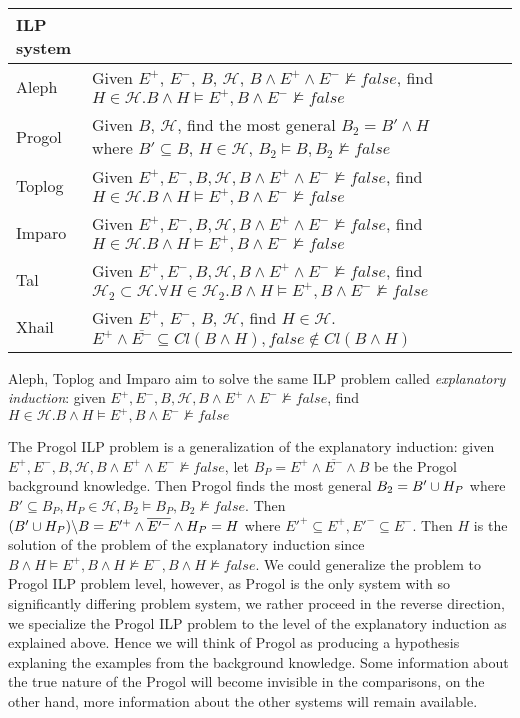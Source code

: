 \begin{center}
    \begin{tabular}{ | l | p{15cm} | l | p{5cm} |}
    \hline
    ILP system & \\ \hline
    Aleph & Given $E^{+}$, $E^{-}$, $B$, $\mathcal{H}$, $B \land E^{+} \land E^{-} \not\models false$, find $H \in \mathcal{H}. B \land H \models E^{+}, B \land E^{-} \not\models false$\\ \hline
    Progol & Given $B$, $\mathcal{H}$, find the most general $B_2 = B' \land H$ where $B' \subseteq B$, $H \in \mathcal{H}$, $B_2 \models B, B_2 \not\models false$\\ \hline
    Toplog & Given $E^{+}, E^{-}, B, \mathcal{H}, B \land E^{+} \land E^{-} \not\models false$, find $H \in \mathcal{H}. B \land H \models E^{+}, B \land E^{-} \not\models false$ \\ \hline
    Imparo & Given $E^{+}, E^{-}, B, \mathcal{H}, B \land E^{+} \land E^{-} \not\models false$, find $H \in \mathcal{H}. B \land H \models E^{+}, B \land E^{-} \not\models false$ \\ \hline
    Tal & Given $E^{+}, E^{-}, B, \mathcal{H}, B \land E^{+} \land E^{-} \not\models false$, find $\mathcal{H}_2 \subset \mathcal{H}. \forall H \in \mathcal{H}_2. B \land H \models E^{+}, B \land E^{-} \not\models false$ \\ \hline
    Xhail & Given $E^{+}$, $E^{-}$, $B$, $\mathcal{H}$, find $H \in \mathcal{H}$. $E^{+} \land \overline{E^{-}} \subseteq Cl(B \land H), false \not\in Cl(B \land H)$\\ \hline
    \end{tabular}
\end{center}

Aleph, Toplog and Imparo aim to solve the same ILP problem called \emph{explanatory induction}:
given $E^{+}, E^{-}, B, \mathcal{H}, B \land E^{+} \land E^{-} \not\models false$, find $H \in \mathcal{H}. B \land H \models E^{+}, B \land E^{-} \not\models false$

The Progol ILP problem is a generalization of the explanatory induction: given $E^{+}, E^{-}, B, \mathcal{H}, B \land E^{+} \land E^{-} \not\models false$,
let $B_P=E^{+} \land \overline{E^{-}} \land B$ be the Progol background knowledge. Then Progol finds the most general $B_2 = B' \cup H_P$ where $B' \subseteq B_P, H_P \in \mathcal{H}, B_2 \models B_P, B_2 \not\models false$.
Then $(B' \cup H_P) \backslash B=E'^{+} \land \overline{E'^-} \land H_P = H$ where $E'^+ \subseteq E^+, E'^- \subseteq E^-$. Then $H$ is the solution of the problem of the explanatory induction since $B \land H \models E^{+}, B \land H \not\models E^{-}, B \land H \not\models false$. We could generalize the problem to Progol ILP problem level, however, as Progol is the only system with so significantly differing problem system, we rather proceed in the reverse direction, we specialize the Progol ILP problem to the level of the explanatory induction as explained above. Hence we will think of Progol as producing a hypothesis explaning the examples from the background knowledge. Some information about the true nature of the Progol will become invisible in the comparisons, on the other hand, more information about the other systems will remain available.

